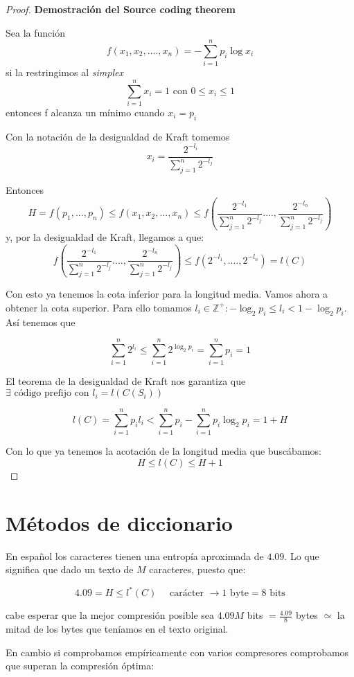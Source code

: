 \begin{proof}
	\textbf{Demostración del Source coding theorem}

	Sea la función
	$$f(x_1 , x_2 , ...., x_n) = -\sum_{i=1}^{n} p_i \log x_i$$
	si la restringimos al \textit{simplex}
	$$\sum_{i=1}^{n} x_i = 1 \text{   con   } 0 \leq x_i \leq 1$$
	entonces f alcanza un mínimo cuando $x_i = p_i$

	Con la notación de la desigualdad de Kraft tomemos
	\[x_i = \frac{2^{-l_i}}{\sum_{j=1}^{n} 2^{-l_j}}\]

	Entonces
	$$H= f(p_1,...,p_n) \leq f(x_1,x_2,...,x_n) \leq f \left(\frac{2^{-l_1}}{\sum_{j=1}^{n} 2^{-l_j}} .... , \frac{2^{-l_n}}{\sum_{j=1}^{n} 2^{-l_j}}\right)$$
	y, por la desigualdad de Kraft, llegamos a que:
	$$f \left(\frac{2^{-l_1}}{\sum_{j=1}^{n} 2^{-l_j}} .... , \frac{2^{-l_n}}{\sum_{j=1}^{n} 2^{-l_j}}\right)\leq f(2^{-l_1} , .... , 2^{-l_n}) = l(C)$$

	Con esto ya tenemos la cota inferior para la longitud media. Vamos ahora a obtener la cota superior. Para ello tomamos $l_i \in \mathbb{Z}^+ : -\log_2 p_i \leq l_i < 1 - \log_2 p_i$. Así tenemos que

	$$\sum^{n}_{i = 1} 2^{l_i} \leq \sum^{n}_{i = 1} 2^{\log_2 p_i} = \sum^{n}_{i = 1} p_i = 1 $$

	El teorema de la desigualdad de Kraft nos garantiza que $\exists \text{ código prefijo con } l_i = l(C(S_i))$

	$$l(C) = \sum^{n}_{i = 1} p_i l_i < \sum^{n}_{i = 1} p_i - \sum^{n}_{i = 1} p_i \log_{2} p_i = 1 + H$$

	Con lo que ya tenemos la acotación de la longitud media que buscábamos:
	\[H \leq l(C) \leq H+1\]

\end{proof}

\section{Métodos de diccionario}
	En español los caracteres tienen una entropía aproximada de $4.09$. Lo que significa que dado un texto de $M$ caracteres, puesto que:

	\[4.09 = H \leq l^{*} (C) \quad \text{ carácter } \rightarrow  1 \text{ byte} = 8 \text{ bits}\]

	cabe esperar que la mejor compresión posible sea $4.09M$ bits $= \frac{4.09}{8}$ bytes $\simeq$ la mitad de los bytes que teníamos en el texto original.

	En cambio si comprobamos empíricamente con varios compresores comprobamos que superan la compresión óptima:

